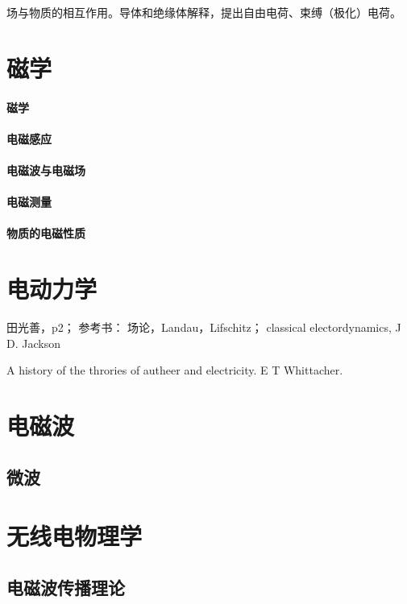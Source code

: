 \documentclass[UTF8]{../06-Physics}
\begin{document}
场与物质的相互作用。导体和绝缘体解释，提出自由电荷、束缚（极化）电荷。


\chapter{磁学}
    \subsubsection{磁学}
    \subsubsection{电磁感应}
    \subsubsection{电磁波与电磁场}
    \subsubsection{电磁测量}
    \subsubsection{物质的电磁性质}


\chapter{电动力学} %

田光善，p2；
参考书：
场论，Landau，Lifschitz；
classical electordynamics, J D. Jackson

A history of the throries of autheer and electricity. E T Whittacher.



\chapter{电磁波}
  \section{微波}
  



  

\chapter{无线电物理学}
\section{电磁波传播理论}
\end{document}
